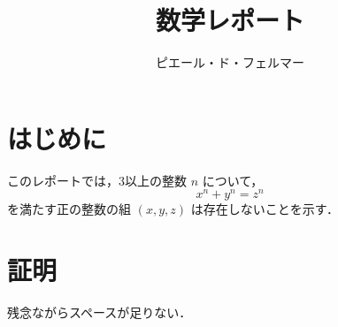 \documentclass{jlreq}
\begin{document}

\title{数学レポート}
\author{ピエール・ド・フェルマー}
\maketitle

\section{はじめに}

このレポートでは，3以上の整数 $n$ について，
\[ x^n + y^n = z^n \]
を満たす正の整数の組 $(x, y, z)$ は存在しないことを示す．

\section{証明}

残念ながらスペースが足りない．
\end{document}
